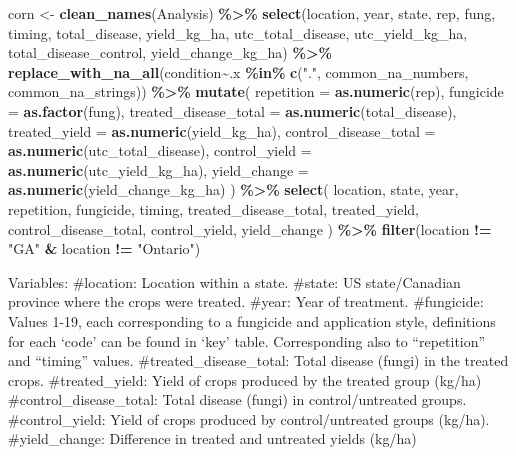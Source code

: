 \documentclass[
]{article}
\newenvironment{Shaded}{\begin{snugshade}}{\end{snugshade}}
\newcommand{\AttributeTok}[1]{\textcolor[rgb]{0.13,0.29,0.53}{#1}}
\newcommand{\FunctionTok}[1]{\textcolor[rgb]{0.13,0.29,0.53}{\textbf{#1}}}
\newcommand{\NormalTok}[1]{#1}
\newcommand{\OtherTok}[1]{\textcolor[rgb]{0.56,0.35,0.01}{#1}}
\newcommand{\SpecialCharTok}[1]{\textcolor[rgb]{0.81,0.36,0.00}{\textbf{#1}}}
\newcommand{\StringTok}[1]{\textcolor[rgb]{0.31,0.60,0.02}{#1}}
\begin{document}
\begin{Shaded}
\begin{Highlighting}[]
\NormalTok{corn }\OtherTok{\textless{}{-}} \FunctionTok{clean\_names}\NormalTok{(Analysis) }\SpecialCharTok{\%\textgreater{}\%} 
  \FunctionTok{select}\NormalTok{(location, year, state, rep, fung, timing, total\_disease, yield\_kg\_ha, utc\_total\_disease, utc\_yield\_kg\_ha, total\_disease\_control, yield\_change\_kg\_ha) }\SpecialCharTok{\%\textgreater{}\%} 
  \FunctionTok{replace\_with\_na\_all}\NormalTok{(condition}\SpecialCharTok{\textasciitilde{}}\NormalTok{.x }\SpecialCharTok{\%in\%} \FunctionTok{c}\NormalTok{(}\StringTok{"."}\NormalTok{, common\_na\_numbers, common\_na\_strings)) }\SpecialCharTok{\%\textgreater{}\%} 
  \FunctionTok{mutate}\NormalTok{(}
    \AttributeTok{repetition =} \FunctionTok{as.numeric}\NormalTok{(rep), }
    \AttributeTok{fungicide =} \FunctionTok{as.factor}\NormalTok{(fung),}
    \AttributeTok{treated\_disease\_total =} \FunctionTok{as.numeric}\NormalTok{(total\_disease),}
    \AttributeTok{treated\_yield =} \FunctionTok{as.numeric}\NormalTok{(yield\_kg\_ha),}
    \AttributeTok{control\_disease\_total =} \FunctionTok{as.numeric}\NormalTok{(utc\_total\_disease),}
    \AttributeTok{control\_yield =} \FunctionTok{as.numeric}\NormalTok{(utc\_yield\_kg\_ha),}
    \AttributeTok{yield\_change =} \FunctionTok{as.numeric}\NormalTok{(yield\_change\_kg\_ha)}
\NormalTok{  ) }\SpecialCharTok{\%\textgreater{}\%} 
  \FunctionTok{select}\NormalTok{(}
\NormalTok{    location, state, year, repetition, fungicide, timing, treated\_disease\_total, treated\_yield, control\_disease\_total, control\_yield, yield\_change}
\NormalTok{  ) }\SpecialCharTok{\%\textgreater{}\%} 
  \FunctionTok{filter}\NormalTok{(location }\SpecialCharTok{!=} \StringTok{"GA"} \SpecialCharTok{\&}\NormalTok{ location }\SpecialCharTok{!=} \StringTok{"Ontario"}\NormalTok{)}
\end{Highlighting}
\end{Shaded}

Variables: \#location: Location within a state. \#state: US
state/Canadian province where the crops were treated. \#year: Year of
treatment. \#fungicide: Values 1-19, each corresponding to a fungicide
and application style, definitions for each `code' can be found in `key'
table. Corresponding also to ``repetition'' and ``timing'' values.
\#treated\_disease\_total: Total disease (fungi) in the treated crops.
\#treated\_yield: Yield of crops produced by the treated group (kg/ha)
\#control\_disease\_total: Total disease (fungi) in control/untreated
groups. \#control\_yield: Yield of crops produced by control/untreated
groups (kg/ha). \#yield\_change: Difference in treated and untreated
yields (kg/ha)
\end{document}
